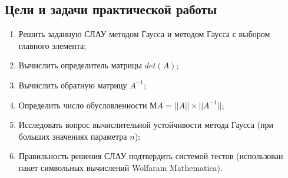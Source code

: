 \documentclass[a4paper,12pt,titlepage,finall]{article}
\begin{document}
\subsection{Цели и задачи практической работы}

\begin{enumerate}
\item
Решить заданную СЛАУ методом Гаусса и методом Гаусса с выбором главного
элемента;
\item
Вычислить определитель матрицы $det(A)$;
\item
Вычислить обратную матрицу $A^{-1}$;
\item
Определить число обусловленности $МA=||A|| \times ||A^{-1}||$;
\item
Исследовать вопрос вычислительной устойчивости метода Гаусса (при больших
значениях параметра $n$);
\item
Правильность решения СЛАУ подтвердить системой тестов (использован пакет символьных вычислений Wolfaram Mathematica).
\end{enumerate}
\end{document}
